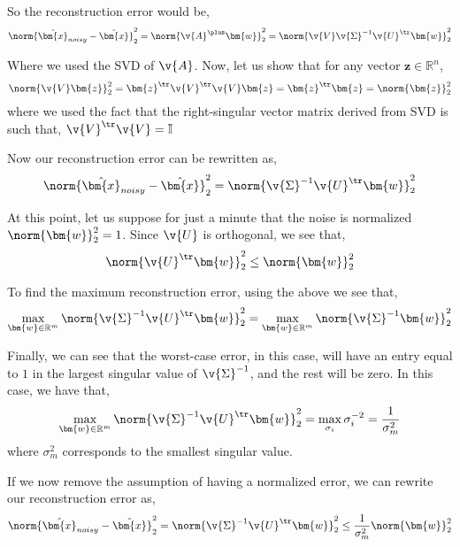 \documentclass[SE,authoryear,toc]{lsstdoc}
\begin{document}
So the reconstruction error would be, 
\begin{equation}
    \norm{\hat{\bm{x}}_{noisy} - \hat{\bm{x}}}_2^2 = \norm{\v{A}^{\plus}\bm{w} }_2^2 = \norm{\v{V}\v{\Sigma}^{-1}\v{U}^{\tr}\bm{w} }_2^2
\end{equation}

Where we used the SVD of $\v{A}$. Now, let us show that for any vector $\bm{z} \in \mathbb{R}^n$, 
\begin{equation}
    \norm{\v{V}\bm{z}}_2^2 = \bm{z}^{\tr}\v{V}^{\tr}\v{V}\bm{z} = \bm{z}^{\tr}\bm{z} =  \norm{\bm{z}}_2^2
\end{equation}
where we used the fact that the right-singular vector matrix derived from SVD is such that, $\v{V}^{\tr}\v{V} = \mathbb{I}$

Now our reconstruction error can be rewritten as, 
\begin{equation}
    \norm{\hat{\bm{x}}_{noisy} - \hat{\bm{x}}}_2^2 = \norm{\v{\Sigma}^{-1}\v{U}^{\tr}\bm{w} }_2^2
\end{equation}

At this point, let us suppose for just a minute that the noise is normalized $\norm{\bm{w}}_2^2 = 1$. Since $\v{U}$ is orthogonal, we see that, 
\begin{equation}
    \norm{\v{U}^{\tr}\bm{w}}_2^2 \leq \norm{\bm{w}}^2_2
\end{equation}

To find the maximum reconstruction error, using the above we see that, 
\begin{equation}
    \max_{\bm{w} \in \mathbb{R}^m} \norm{\v{\Sigma}^{-1}\v{U}^{\tr}\bm{w} }_2^2 = \max_{\bm{w} \in \mathbb{R}^m} \norm{\v{\Sigma}^{-1}\bm{w} }_2^2
\end{equation}

Finally, we can see that the worst-case error, in this case, will have an entry equal to $1$ in the largest singular value of $\v{\Sigma}^{-1}$, and the rest will be zero. In this case, we have that,
\begin{equation}
    \max_{\bm{w} \in \mathbb{R}^m} \norm{\v{\Sigma}^{-1}\v{U}^{\tr}\bm{w} }_2^2 = \max_{\sigma_i} \sigma_i^{-2} = \frac{1}{\sigma_m^2}
\end{equation}
where $\sigma_m^2$ corresponds to the smallest singular value. 

If we now remove the assumption of having a normalized error, we can rewrite our reconstruction error as, 
\begin{equation}
    \norm{\hat{\bm{x}}_{noisy} - \hat{\bm{x}}}_2^2 = \norm{\v{\Sigma}^{-1}\v{U}^{\tr}\bm{w} }_2^2 \leq  \frac{1}{\sigma_m^2} \norm{\bm{w}}^2_2
\end{equation}
\end{document}
